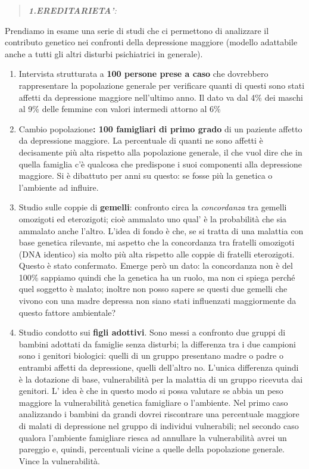 \documentclass[]{article}
\begin{document}
\begin{quote}
\emph{\textbf{1.EREDITARIETA'}:}
\end{quote}

Prendiamo in esame una serie di studi che ci permettono di analizzare il
contributo genetico nei confronti della depressione maggiore (modello
adattabile anche a tutti gli altri disturbi psichiatrici in generale).

\begin{enumerate}
\def\labelenumi{\arabic{enumi}.}
\item
  Intervista strutturata a \textbf{100 persone prese a caso} che
  dovrebbero rappresentare la popolazione generale per verificare quanti
  di questi sono stati affetti da depressione maggiore nell'ultimo anno.
  Il dato va dal 4\% dei maschi al 9\% delle femmine con valori
  intermedi attorno al 6\%
\item
  Cambio popolazione\textbf{: 100 famigliari di primo grado} di un
  paziente affetto da depressione maggiore. La percentuale di quanti ne
  sono affetti è decisamente più alta rispetto alla popolazione
  generale, il che vuol dire che in quella famiglia c'è qualcosa che
  predispone i suoi componenti alla depressione maggiore. Si è dibattuto
  per anni su questo: se fosse più la genetica o l'ambiente ad influire.
\item
  Studio sulle coppie di \textbf{gemelli}: confronto circa la
  \emph{concordanza} tra gemelli omozigoti ed eterozigoti; cioè ammalato
  uno qual' è la probabilità che sia ammalato anche l'altro. L'idea di
  fondo è che, se si tratta di una malattia con base genetica rilevante,
  mi aspetto che la concordanza tra fratelli omozigoti (DNA identico)
  sia molto più alta rispetto alle coppie di fratelli eterozigoti.
  Questo è stato confermato. Emerge però un dato: la concordanza non è
  del 100\% sappiamo quindi che la genetica ha un ruolo, ma non ci
  spiega perché quel soggetto è malato; inoltre non posso sapere se
  questi due gemelli che vivono con una madre depressa non siano stati
  influenzati maggiormente da questo fattore ambientale?
\item
  Studio condotto sui \textbf{figli adottivi}. Sono messi a confronto
  due gruppi di bambini adottati da famiglie senza disturbi; la
  differenza tra i due campioni sono i genitori biologici: quelli di un
  gruppo presentano madre o padre o entrambi affetti da depressione,
  quelli dell'altro no. L'unica differenza quindi è la dotazione di
  base, vulnerabilità per la malattia di un gruppo ricevuta dai
  genitori. L' idea è che in questo modo si possa valutare se abbia un
  peso maggiore la vulnerabilità genetica famigliare o l'ambiente. Nel
  primo caso analizzando i bambini da grandi dovrei riscontrare una
  percentuale maggiore di malati di depressione nel gruppo di individui
  vulnerabili; nel secondo caso qualora l'ambiente famigliare riesca ad
  annullare la vulnerabilità avrei un pareggio e, quindi, percentuali
  vicine a quelle della popolazione generale. Vince la vulnerabilità.
\end{enumerate}
\end{document}
